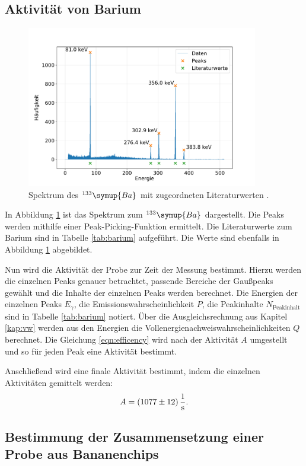 \subsection{Aktivität von Barium}
\begin{figure}[h!]
  \centering
  \includegraphics[width=0.9\textwidth]{content/images/barium_markiert.pdf}
  \caption{Spektrum des $^{133}\symup{Ba}$ mit zugeordneten Literaturwerten \cite{nucleide}.}
  \label{fig:ba_spectrum}
\end{figure}
In Abbildung \ref{fig:ba_spectrum} ist das Spektrum zum $^{133}\symup{Ba}$ dargestellt.
Die Peaks werden mithilfe einer Peak-Picking-Funktion ermittelt.
Die Literaturwerte zum Barium \cite{nucleide} sind in Tabelle \ref{tab:barium} aufgeführt.
Die Werte sind ebenfalls in Abbildung \ref{fig:ba_spectrum} abgebildet.

Nun wird die Aktivität der Probe zur Zeit der Messung bestimmt.
Hierzu werden die einzelnen Peaks genauer betrachtet, passende Bereiche der Gaußpeaks gewählt und die Inhalte der einzelnen Peaks werden berechnet.
Die Energien der einzelnen Peaks $E_{\gamma}$, die Emissionswahrscheinlichkeit $P$, die Peakinhalte $N_{\text{Peakinhalt}}$ sind in Tabelle \ref{tab:barium} notiert.
Über die Ausgleichsrechnung aus Kapitel \ref{kap:vw} werden aus den Energien die Vollenergienachweiswahrscheinlichkeiten $Q$ berechnet.
Die Gleichung \eqref{eqn:efficency} wird nach der Aktivität $A$ umgestellt und so für jeden Peak eine Aktivität bestimmt.

Anschließend wird eine finale Aktivität bestimmt, indem die einzelnen Aktivitäten gemittelt werden:
\begin{equation*}
    A = \SI{1077 (12)}{\frac{1}{s}}.
\end{equation*}

\subsection{Bestimmung der Zusammensetzung einer Probe aus Bananenchips}
